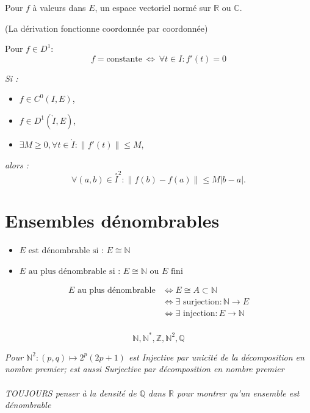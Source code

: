 \documentclass[a4paper,12pt]{report}
\newcommand{\Def}[2]{\begin{tcolorbox}[colback=white,colframe=CornflowerBlue, title=Définition : #1]#2\end{tcolorbox}}
\newcommand{\Thm}[2]{\begin{tcolorbox}[colback=white,colframe=Red!60, title=Théorème : #1]#2\end{tcolorbox}}
\def\R{\mathbb{R}}
\def\C{\mathbb{C}}
\def\Q{\mathbb{Q}}
\def\N{\mathbb{N}}
\def\Z{\mathbb{Z}}
\newcommand{\ssi}{\Longleftrightarrow}
\begin{document}
Pour \( f \) à valeurs dans \( E \), un espace vectoriel normé sur \( \R \) ou \( \C \).

(La dérivation fonctionne coordonnée par coordonnée)

\Thm{Caractérisation des fonctions constantes}{
Pour \(f \in D^1\):
\[ f = \text{constante} \ \Leftrightarrow\ \forall t \in I : f'(t) = 0 \]
}

\Thm{Inégalité des accroissements finis (IAF)}{
\textit{Si :}
\begin{itemize}
    \item[] \( f \in C^0(I, E) \),
    \item[] \( f \in D^1(\mathring{I}, E) \),
    \item[] \( \exists M \geq 0, \forall t \in \mathring{I} : \|f'(t)\| \leq M \),
\end{itemize}
\textit{alors :}
\[
\forall (a,b) \in \overset{\circ}{I}^2 : \|f(b) - f(a)\| \leq M |b - a|.
\]
}

\section{Ensembles dénombrables}
\Def{Ensemble dénombrable / au plus dénombrable}{
\begin{itemize}
    \item \(E \text{ est dénombrable si : }  E \cong \N\)
    \item \(E \text{ au plus dénombrable si : }  E \cong \N \text{ ou } E \text{ fini}\) 
\end{itemize}
}

\Thm{Caractérisation de "au plus dénombrable"}{
\begin{align*}
    E \text{ au plus dénombrable} 
    &\ssi E \cong A\subset\N\\
    &\ssi \exists\text{ surjection}:\N\to E\\
    &\ssi \exists\text{ injection}: E\to \N\\
\end{align*}
}

\Thm{Liste usuelle d'ensembles dénombrables}{
    \[\N, \N^*, \Z, \N^2, \Q\]

    \textit{Pour $\N^2: (p,q)\longmapsto2^p(2p+1)$ est Injective par unicité de la décomposition en nombre premier; est aussi Surjective par décomposition en nombre premier\\\\TOUJOURS penser à la densité de $\Q$ dans $\R$ pour montrer qu'un ensemble est dénombrable}
}
\end{document}
